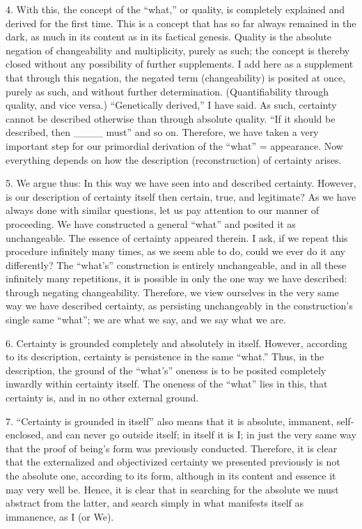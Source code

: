 4. With this, the concept of the “what,” or quality,
is completely explained and derived for the first time.
This is a concept that has so far always remained in the dark,
as much in its content as in its factical genesis.
Quality is the absolute negation of
changeability and multiplicity, purely as such;
the concept is thereby closed without
any possibility of further supplements.
I add here as a supplement that through this negation,
the negated term (changeability) is posited at once,
purely as such, and without further determination.
(Quantifiability through quality, and vice versa.)
“Genetically derived,” I have said.
As such, certainty cannot be described otherwise
than through absolute quality.
“If it should be described, then ____ must” and so on.
Therefore, we have taken a very important step
for our primordial derivation of the “what” = appearance.
Now everything depends on how
the description (reconstruction) of certainty arises.

5. We argue thus:
In this way we have seen into and described certainty.
However, is our description of certainty itself then
certain, true, and legitimate?
As we have always done with similar questions,
let us pay attention to our manner of proceeding.
We have constructed a general “what”
and posited it as unchangeable.
The essence of certainty appeared therein.
I ask, if we repeat this procedure infinitely many times,
as we seem able to do, could we ever do it any differently?
The “what's” construction is entirely unchangeable,
and in all these infinitely many repetitions,
it is possible in only the one way we have described:
through negating changeability.
Therefore, we view ourselves in the very same way
we have described certainty, as persisting unchangeably
in the construction's single same “what”;
we are what we say, and we say what we are.

6. Certainty is grounded completely and absolutely in itself.
However, according to its description,
certainty is persistence in the same “what.”
Thus, in the description, the ground of the “what's” oneness is
to be posited completely inwardly within certainty itself.
The oneness of the “what” lies in this,
that certainty is, and in no other external ground.

7. “Certainty is grounded in itself” also means
that it is absolute, immanent, self-enclosed,
and can never go outside itself;
in itself it is I;
in just the very same way that
the proof of being's form was previously conducted.
Therefore, it is clear that the externalized and objectivized
certainty we presented previously is not
the absolute one, according to its form,
although in its content and essence it may very well be.
Hence, it is clear that in searching for the absolute
we must abstract from the latter,
and search simply in what manifests
itself as immanence, as I (or We).

